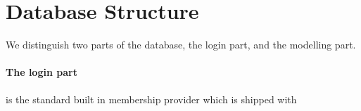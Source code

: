 \section{Database Structure}
\label{sec:databasestructure}

We distinguish two parts of the database, the login part, and the modelling part.

\paragraph{The login part} is the standard built in membership provider which is shipped with 